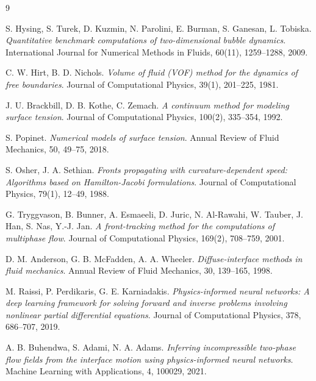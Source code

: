 \documentclass[12pt,a4paper]{article}
\begin{document}
\begin{thebibliography}{9}

S. Hysing, S. Turek, D. Kuzmin, N. Parolini, E. Burman, S. Ganesan, L. Tobiska.
\textit{Quantitative benchmark computations of two-dimensional bubble dynamics}.
International Journal for Numerical Methods in Fluids, 60(11), 1259--1288, 2009.

C. W. Hirt, B. D. Nichols.
\textit{Volume of fluid (VOF) method for the dynamics of free boundaries}.
Journal of Computational Physics, 39(1), 201--225, 1981.

J. U. Brackbill, D. B. Kothe, C. Zemach.
\textit{A continuum method for modeling surface tension}.
Journal of Computational Physics, 100(2), 335--354, 1992.

S. Popinet.
\textit{Numerical models of surface tension}.
Annual Review of Fluid Mechanics, 50, 49--75, 2018.

S. Osher, J. A. Sethian.
\textit{Fronts propagating with curvature-dependent speed: Algorithms based on Hamilton-Jacobi formulations}.
Journal of Computational Physics, 79(1), 12--49, 1988.

G. Tryggvason, B. Bunner, A. Esmaeeli, D. Juric, N. Al-Rawahi, W. Tauber,
J. Han, S. Nas, Y.-J. Jan.
\textit{A front-tracking method for the computations of multiphase flow}.
Journal of Computational Physics, 169(2), 708--759, 2001.

D. M. Anderson, G. B. McFadden, A. A. Wheeler.
\textit{Diffuse-interface methods in fluid mechanics}.
Annual Review of Fluid Mechanics, 30, 139--165, 1998.

M. Raissi, P. Perdikaris, G. E. Karniadakis.
\textit{Physics-informed neural networks: A deep learning framework for solving forward and inverse problems involving nonlinear partial differential equations}.
Journal of Computational Physics, 378, 686--707, 2019.

A. B. Buhendwa, S. Adami, N. A. Adams.
\textit{Inferring incompressible two-phase flow fields from the interface motion using physics-informed neural networks}.
Machine Learning with Applications, 4, 100029, 2021.

\end{thebibliography}
\end{document}
